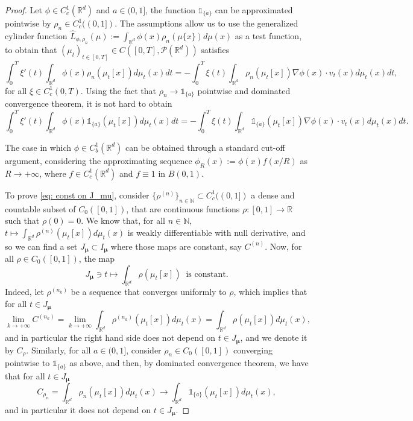 \documentclass[10pt,leqno]{amsart}
\numberwithin{equation}{section}
\newcommand{\R}{\mathbb{R}}
\newcommand{\N}{\mathbb{N}}
\newcommand{\PP}{\mathcal{P}}
\begin{document}
\begin{proof}
    Let $\phi\in C_c^1(\R^d)$ and $a\in (0,1]$, the function $\mathds{1}_{\{a\}}$ can be approximated pointwise by $\rho_n \in C_c^1((0,1])$. The assumptions allow us to use the generalized cylinder function $\hat{L}_{\phi,\rho_n}(\mu) := \int_{\R^d} \phi(x) \rho_n(\mu\{x\})d\mu(x)$ as a test function, to obtain that $(\mu_t)_{t\in [0,T]} \in C([0,T],\PP(\R^d))$ satisfies 
    \[\int_0^T \xi'(t) \int_{\R^d} \phi(x) \rho_n(\mu_t[x])d\mu_t(x) dt = - \int_0^T \xi(t) \int_{\R^d}  \rho_n(\mu_t[x]) \nabla \phi(x)\cdot  v_t(x) d\mu_t(x) dt,\]
    for all $\xi \in C_c^1(0,T)$. Using the fact that $\rho_n \to \mathds{1}_{\{a\}}$ pointwise and dominated convergence theorem, it is not hard to obtain
    \[\int_0^T \xi'(t) \int_{\R^d} \phi(x) \mathds{1}_{\{a\}}(\mu_t[x])d\mu_t(x) dt = - \int_0^T \xi(t) \int_{\R^d}  \mathds{1}_{\{a\}}(\mu_t[x]) \nabla \phi(x)\cdot  v_t(x) d\mu_t(x) dt.\]

    The case in which $\phi \in C_b^1(\R^d)$ can be obtained through a standard cut-off argument, considering the approximating sequence $\phi_R(x) := \phi(x) f(x/R)$ as $R\to +\infty$, where $f \in C_c^1(\R^d)$ and $f\equiv 1$ in $B(0,1)$.

    To prove \eqref{eq: const on J_mu}, consider $\{\rho^{(n)}\}_{n\in \N}\subset C_c^1((0,1])$ a dense and countable subset of $C_0([0,1])$, that are continuous functions $\rho:[0,1]\to\R$ such that $\rho(0) = 0$. We know that, for all $n\in \N$,  
    \( t\mapsto \int_{\R^d} \rho^{(n)}(\mu_t[x]) d\mu_t(x)\)
    is weakly differentiable with null derivative, and so we can find a set $J_{\boldsymbol{\mu}} \subset I_{\boldsymbol{\mu}}$ where those maps are constant, say $C^{(n)}$. 
    Now, for all $\rho\in C_0([0,1])$, the map 
    \[J_{\boldsymbol{\mu}} \ni t \mapsto \int_{\R^d} \rho(\mu_t[x]) \ \text{ is constant.}\]
    Indeed, let $\rho^{(n_k)}$ be a sequence that converges uniformly to $\rho$, which implies that for all $t\in J_{\boldsymbol{\mu}}$
    \[\lim_{k\to +\infty} C^{(n_k)} = \lim_{k \to +\infty} \int_{\R^d} \rho^{(n_k)}(\mu_t[x]) d\mu_t(x) = \int_{\R^d} \rho(\mu_t[x]) d\mu_t(x),\]
    and in particular the right hand side does not depend on $t\in J_{\boldsymbol{\mu}}$, and we denote it by $C_{\rho}$. Similarly, for all $a\in (0,1]$, consider $\rho_{n} \in C_0([0,1])$ converging pointwise to $\mathds{1}_{\{a\}}$ as above, and then, by dominated convergence theorem, we have that for all $t\in J_{\boldsymbol{\mu}}$
    \[C_{\rho_n} = \int_{\R^d} \rho_n(\mu_t[x]) d\mu_t(x) \to \int_{\R^d} \mathds{1}_{\{a\}}(\mu_t[x]) d\mu_t(x),\]
    and in particular it does not depend on $t\in J_{\boldsymbol{\mu}}$.
\end{proof}
\end{document}
